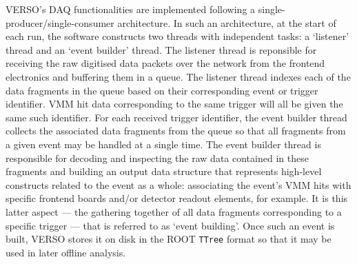 VERSO's DAQ functionalities are implemented following a single-producer/single-consumer
architecture.
In such an architecture, at the start of each run, the software constructs two threads with independent
tasks: a `listener' thread and an `event builder' thread.
The listener thread is reponsible for receiving the raw digitised data packets over the network from the
frontend electronics and buffering them in a queue.
The listener thread indexes each of the data fragments in the queue based on their corresponding
event or trigger identifier.
VMM hit data corresponding to the same trigger will all be given the
same such identifier.
For each received trigger identifier, the event builder thread collects the associated data fragments from
the queue so that all fragments from a given event may be handled at a single time.
The event builder thread is responsible for decoding and inspecting the raw data contained in these fragments and building
an output data structure that represents high-level constructs related to the event as a whole: associating
the event's VMM hits with specific frontend boards and/or detector readout elements, for example.
It is this latter aspect --- the gathering together of all data fragments corresponding to a specific trigger ---
that is referred to as `event building'.
Once such an event is built, VERSO stores it on disk in the ROOT \texttt{TTree} format
so that it may be used in later offline analysis.

